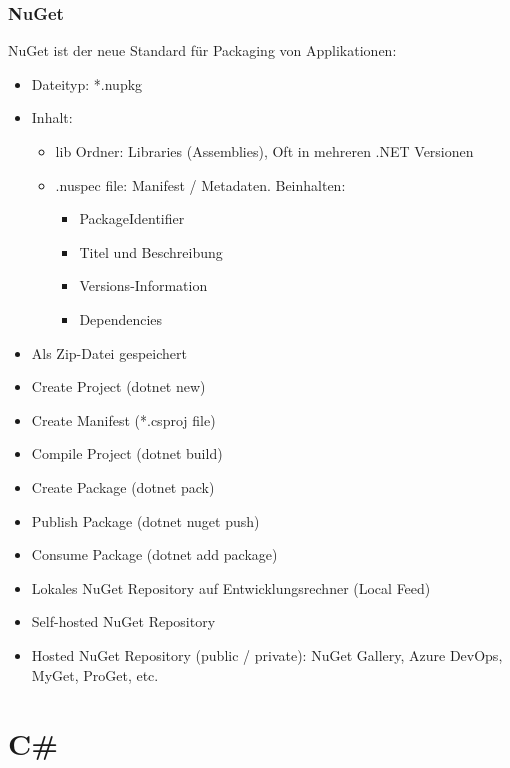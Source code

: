 \begin{multicols*}{2}
\subsubsection{NuGet}
NuGet ist der neue Standard für Packaging von Applikationen:
\begin{itemize}
    \item Dateityp: *.nupkg
    \item Inhalt:
    \begin{itemize}
        \item lib Ordner: Libraries (Assemblies), Oft in mehreren .NET Versionen
        \item .nuspec file: Manifest / Metadaten. Beinhalten:
        \begin{itemize}
            \item PackageIdentifier
            \item Titel und Beschreibung
            \item Versions-Information
            \item Dependencies
        \end{itemize}
    \end{itemize}
    \item Als Zip-Datei gespeichert
\end{itemize}
\vspace*{2mm}
\begin{itemize}
    \item Create Project (dotnet new)
    \item Create Manifest (*.csproj file)
    \item Compile Project (dotnet build)
    \item Create Package (dotnet pack)
    \item Publish Package (dotnet nuget push)
    \item Consume Package (dotnet add package)
\end{itemize}
\begin{itemize}
    \item Lokales NuGet Repository auf Entwicklungsrechner (Local Feed)
    \item Self-hosted NuGet Repository
    \item Hosted NuGet Repository (public / private): NuGet Gallery, Azure DevOps, MyGet, ProGet, etc.
\end{itemize}


\section{C\#}

\end{multicols*}

